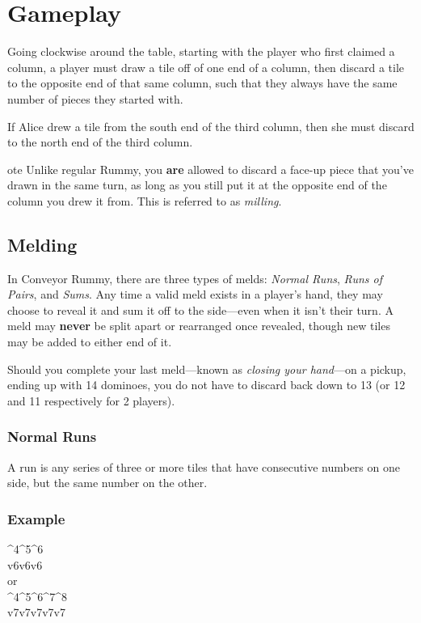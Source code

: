 \section{Gameplay}
Going clockwise around the table, starting with the player who first claimed a column, a player must draw a tile off of one end of a column, then discard a tile to the opposite end of that same column, such that they always have the same number of pieces they started with.

\example If Alice drew a tile from the south end of the third column, then she must discard to the north end of the third column.

ote Unlike regular Rummy, you \textbf{are} allowed to discard a face-up piece that you've drawn in the same turn, as long as you still put it at the opposite end of the column you drew it from. This is referred to as \textit{milling}.

\subsection{Melding}
In Conveyor Rummy, there are three types of melds: \textit{Normal Runs}, \textit{Runs of Pairs}, and \textit{Sums}.
Any time a valid meld exists in a player's hand, they may choose to reveal it and sum it off to the side---even when it isn't their turn.
A meld may \textbf{never} be split apart or rearranged once revealed, though new tiles may be added to either end of it.

Should you complete your last meld---known as \textit{closing your hand}---on a pickup, ending up with 14 dominoes, you do not have to discard back down to 13 (or 12 and 11 respectively for 2 players).

\subsubsection{Normal Runs}
A run is any series of three or more tiles that have consecutive numbers on one side, but the same number on the other.

\subsubsection*{Example}
{\domino ^4^5^6\\v6v6v6}\vspace{1mm}\\
\vspace{1mm}or\\
{\domino ^4^5^6^7^8\\v7v7v7v7v7}

